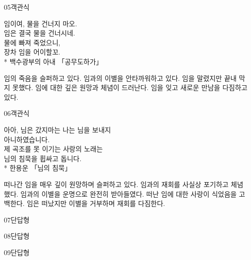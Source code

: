\documentclass[fs9,seriesRus]{korfarm-base}
\begin{document}
\begin{kfQBlock}{05}{객관식}
\begin{kfEvidence}임이여, 물을 건너지 마오.   \\\relax
   임은 결국 물을 건너시네.   \\\relax
   물에 빠져 죽었으니,   \\\relax
   장차 임을 어이할꼬.   \\\relax
   * 백수광부의 아내 「공무도하가」\end{kfEvidence}
\begin{kfChoices}
\kfChoice 임의 죽음을 슬퍼하고 있다.
\kfChoice 임과의 이별을 안타까워하고 있다.
\kfChoice 임을 말렸지만 끝내 막지 못했다.
\kfChoice 임에 대한 깊은 원망과 체념이 드러난다.
\kfChoice 임을 잊고 새로운 만남을 다짐하고 있다.
\end{kfChoices}
\end{kfQBlock}
\begin{kfQBlock}{06}{객관식}
\begin{kfEvidence}아아, 님은 갔지마는 나는 님을 보내지   \\\relax
   아니하였습니다.   \\\relax
   제 곡조를 못 이기는 사랑의 노래는   \\\relax
   님의 침묵을 휩싸고 돕니다.   \\\relax
   * 한용운 「님의 침묵」\end{kfEvidence}
\begin{kfChoices}
\kfChoice 떠나간 임을 매우 깊이 원망하며 슬퍼하고 있다.
\kfChoice 임과의 재회를 사실상 포기하고 체념했다.
\kfChoice 임과의 이별을 운명으로 완전히 받아들였다.
\kfChoice 떠난 임에 대한 사랑이 식었음을 고백한다.
\kfChoice 임은 떠났지만 이별을 거부하며 재회를 다짐한다.
\end{kfChoices}
\end{kfQBlock}
\begin{kfQBlock}{07}{단답형}
\end{kfQBlock}
\begin{kfQBlock}{08}{단답형}
\end{kfQBlock}
\begin{kfQBlock}{09}{단답형}
\end{kfQBlock}
\end{document}
